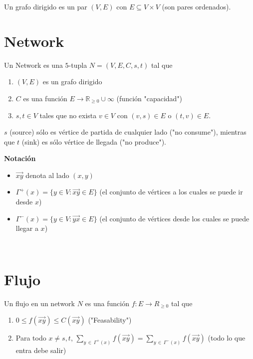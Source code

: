 \documentclass[10pt,a4paper]{article}
\begin{document}
Un grafo dirigido es un par $(V, E)$ con $E \subseteq V \times V$ (son pares ordenados).

\section*{Network}

Un Network es una $5$-tupla $N = (V, E, C, s, t)$ tal que

\begin{enumerate}

	\item $(V, E)$ es un grafo dirigido
	\item $C$ es una función $E \rightarrow \mathbb{R}_{\geq0} \cup \infty$ (función "capacidad")
	\item $s, t \in V$ tales que no exista $v\in V$ con $(v, s) \in E$ o $(t,v)\in E$.
\end{enumerate}

$s$ (source) sólo es vértice de partida de cualquier lado ("no consume"), mientras que $t$ (sink) es sólo vértice de llegada ("no produce").

\textbf{Notación}

\begin{itemize}

	\item \textbf{$\overrightarrow{xy}$ }denota al lado $(x, y)$
	\item $\Gamma^+(x) = \{y \in V: \overrightarrow{xy} \in E\}$ (el conjunto de vértices a los cuales se puede ir desde $x$)
	\item $\Gamma^-(x) = \{y \in V: \overrightarrow{yx} \in E\}$ (el conjunto de vértices desde los cuales se puede llegar a $x$)
\end{itemize}

 

\section*{Flujo}

Un flujo en un network $N$ es una función $f: E \rightarrow R_{\geq 0}$ tal que

\begin{enumerate}

	\item $0 \leq f(\overrightarrow{xy})\leq C(\overrightarrow{xy})$ ("Feasability")
	\item Para todo $x \neq s, t$, $\sum\limits_{y\,\in\,\Gamma^+(x)} f(\overrightarrow{xy}) = \sum\limits_{y\,\in\,\Gamma^-(x)} f(\overrightarrow{xy})$ (todo lo que entra debe salir)
\end{enumerate}
\end{document}
